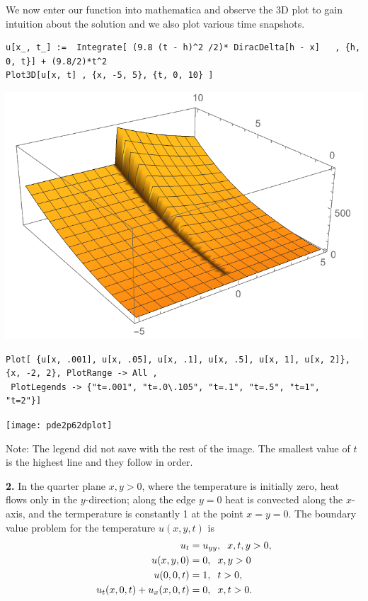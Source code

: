 \documentclass{article}
\begin{document}
\newpage
We now enter our function into mathematica and observe the 3D plot to gain intuition about the solution and we also plot various time snapshots. 

\begin{verbatim}
u[x_, t_] :=  Integrate[ (9.8 (t - h)^2 /2)* DiracDelta[h - x]   , {h, 0, t}] + (9.8/2)*t^2 
Plot3D[u[x, t] , {x, -5, 5}, {t, 0, 10} ]
\end{verbatim}

\begin{centering}
\includegraphics{pde2p63dplot}
\end{centering}

\begin{verbatim}
Plot[ {u[x, .001], u[x, .05], u[x, .1], u[x, .5], u[x, 1], u[x, 2]}, {x, -2, 2}, PlotRange -> All , 
 PlotLegends -> {"t=.001", "t=.0\.105", "t=.1", "t=.5", "t=1",  "t=2"}] 
\end{verbatim}

\begin{centering}
\texttt{[image: pde2p62dplot]}
\end{centering}

Note: The legend did not save with the rest of the image. The smallest value of \(t\) is the highest line and they follow in order. 
\newpage

\textbf{2.} In the quarter plane \(x,y>0\), where the temperature is initially zero, heat flows only in the \(y\)-direction; along the edge \(y=0\) heat is convected along the \(x\)-axis, and the termperature is constantly 1 at the point \(x=y=0\). The boundary value problem for the temperature \(u(x,y,t) \) is 
\begin{align*}
u_t&=u_{yy}, \hspace{2mm} x,t,y>0, \\
u(x,y,0)&= 0 , \hspace{2mm} x,y>0 \\
u(0,0,t)&= 1, \hspace{2mm} t>0,\\
u_t(x,0,t)+ u_x(x,0,t) &= 0, \hspace{2mm}  x,t>0. 
\end{align*}
\end{document}
